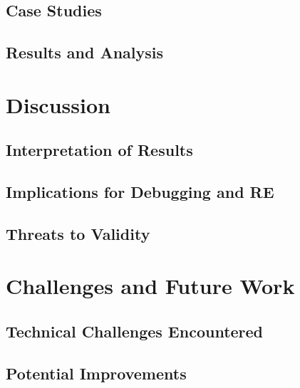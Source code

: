 \documentclass[conference]{IEEEtran}
\begin{document}
\subsection{Case Studies}

\subsection{Results and Analysis}

\section{Discussion}

\subsection{Interpretation of Results}

\subsection{Implications for Debugging and RE}

\subsection{Threats to Validity}

\section{Challenges and Future Work}

\subsection{Technical Challenges Encountered}

\subsection{Potential Improvements}
\end{document}
